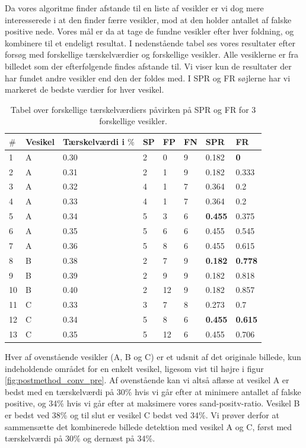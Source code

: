 Da vores algoritme finder afstande til en liste af vesikler er vi dog mere interesserede i at den finder færre vesikler, mod at den holder antallet af falske positive nede. Vores mål er da at tage de fundne vesikler efter hver foldning, og kombinere til et endeligt resultat. I nedenstående tabel ses vores resultater efter forsøg med forskellige tærskelværdier og forskellige  vesikler. Alle vesiklerne er fra billedet som der efterfølgende findes afstande til. Vi viser kun de resultater der har fundet andre vesikler end den der foldes med. I SPR og FR søjlerne har vi markeret de bedste værdier for hver vesikel.
\begin{table}[H]
	\centering
\begin{tabular}{l|l|l|l|l|l|l|l}
	$\#$ & Vesikel & Tærskelværdi i $\%$ & SP & FP & FN & SPR & FR \\\hline
	1	&	A	&	0.30	& 2		& 0		&9 	&0.182 			&\textbf{0}\\\hline
	2	&	A	&	0.31	& 2		& 1		&9 	&0.182 			&0.333\\\hline
	3	&	A	&	0.32	& 4		& 1		&7  &0.364 			&0.2\\\hline
	4	&	A	&	0.33	& 4		& 1		&7  &0.364 			&0.2\\\hline
	5	&	A	&	0.34	& 5		& 3		&6  &\textbf{0.455}	&0.375\\\hline
	6	&	A	&	0.35	& 5		& 6		&6  &0.455 			&0.545\\\hline
	7	&	A	&	0.36	& 5		& 8		&6  &0.455			&0.615\\\hline	
	8	&	B	&	0.38	& 2		& 7		&9 	&\textbf{0.182}	&\textbf{0.778}\\\hline
	9	&	B	&	0.39	& 2		& 9		&9 	&0.182 			&0.818\\\hline
	10	&	B	&	0.40	& 2		& 12	&9 	&0.182 			&0.857\\\hline	
	11	&	C	&	0.33	& 3		& 7		&8 	&0.273 			&0.7\\\hline
	12	&	C	&	0.34	& 5		& 8		&6 	&\textbf{0.455}	&\textbf{0.615}\\\hline
	13	&	C	&	0.35	& 5		& 12	&6 	&0.455 			&0.706
\end{tabular}
\caption{Tabel over forskellige tærskelværdiers påvirken på SPR og FR for 3 forskellige vesikler.\label{tab:postmethod_tabelll}}
\end{table}

Hver af ovenstående vesikler (A, B og C) er et udsnit af det originale billede, kun indeholdende området for en enkelt vesikel, ligesom vist til højre i figur \ref{fig:postmethod_conv_pre}. Af ovenstående kan vi altså aflæse at vesikel A er bedst med en tærskelværdi på 30\% hvis vi går efter at minimere antallet af falske positive, og 34\% hvis vi går efter at maksimere vores sand-positv-ratio. Vesikel B er bedst ved 38\% og til slut er vesikel C bedst ved 34\%. Vi prøver derfor at sammensætte det kombinerede billede detektion med vesikel A og C, først med tærskelværdi på 30\% og dernæst på 34\%. 

